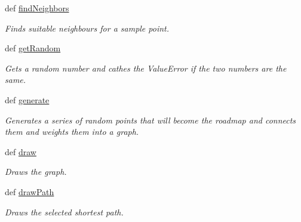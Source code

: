 \begin{DoxyCompactItemize}
def \hyperlink{classprm_1_1PRMGenerator_a2acf210887cb331b20c5378da634b4eb}{find\-Neighbors}
\begin{DoxyCompactList}\small\item\em Finds suitable neighbours for a sample point. \end{DoxyCompactList}\item 
def \hyperlink{classprm_1_1PRMGenerator_acefd405f735018b6399df96c7025e7fe}{get\-Random}
\begin{DoxyCompactList}\small\item\em Gets a random number and cathes the Value\-Error if the two numbers are the same. \end{DoxyCompactList}\item 
def \hyperlink{classprm_1_1PRMGenerator_aabedd114ea5948bb92f477be30b41619}{generate}
\begin{DoxyCompactList}\small\item\em Generates a series of random points that will become the roadmap and connects them and weights them into a graph. \end{DoxyCompactList}\item 
def \hyperlink{classprm_1_1PRMGenerator_a2673d3d75416b4376244a24bf2504435}{draw}
\begin{DoxyCompactList}\small\item\em Draws the graph. \end{DoxyCompactList}\item 
def \hyperlink{classprm_1_1PRMGenerator_ab001351e371b3d9963b08bc91b5ddab9}{draw\-Path}
\begin{DoxyCompactList}\small\item\em Draws the selected shortest path. \end{DoxyCompactList}\end{DoxyCompactItemize}
